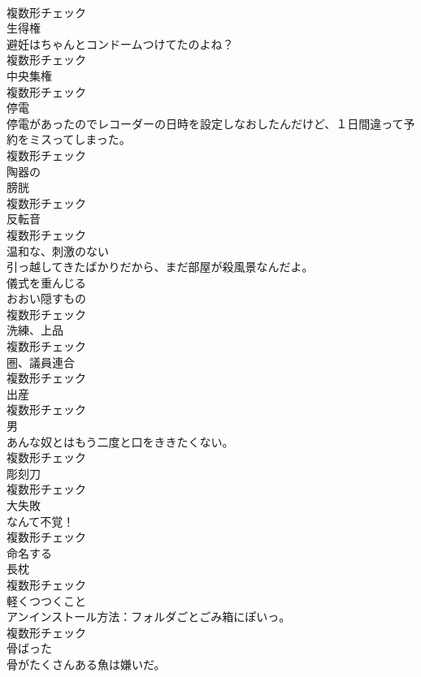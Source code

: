 \documentclass[8pt]{extreport}
\begin{document}
\begin{CJK}{UTF8}{min}
\\	複数形チェック
\\	[名詞]	生得権	
\\	避妊はちゃんとコンドームつけてたのよね？	
\\	複数形チェック
\\	[名詞]	中央集権	
\\	複数形チェック
\\	[名詞]	停電	
\\	停電があったのでレコーダーの日時を設定しなおしたんだけど、１日間違って予約をミスってしまった。	
\\	複数形チェック
\\	[形容詞]	陶器の	
\\	[名詞]	膀胱	
\\	複数形チェック
\\	[名詞]	反転音	
\\	複数形チェック
\\	[形容詞]	温和な、刺激のない	
\\	引っ越してきたばかりだから、まだ部屋が殺風景なんだよ。	
\\	[形容詞]	儀式を重んじる	
\\	[名詞]	おおい隠すもの	
\\	複数形チェック
\\	[名詞]	洗練、上品	
\\	複数形チェック
\\	[名詞]	圏、議員連合	
\\	複数形チェック
\\	[名詞]	出産	
\\	複数形チェック
\\	[名詞]	男	
\\	あんな奴とはもう二度と口をききたくない。	
\\	複数形チェック
\\	[名詞]	彫刻刀	
\\	複数形チェック
\\	[名詞]	大失敗	
\\	なんて不覚！	
\\	複数形チェック
\\	[動詞]	命名する	
\\	[名詞]	⻑枕	
\\	複数形チェック
\\	[名詞]	軽くつつくこと	
\\	アンインストール方法：フォルダごとごみ箱にぽいっ。	
\\	複数形チェック
\\	[形容詞]	骨ばった	
\\	骨がたくさんある魚は嫌いだ。	

\end{CJK}
\end{document}

